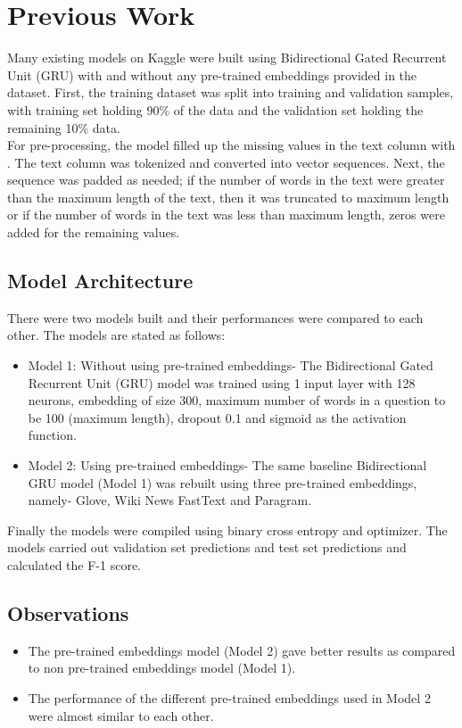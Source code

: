 \section{Previous Work}
Many existing models \cite{Kaggle1} on Kaggle were built using Bidirectional Gated Recurrent Unit (GRU) with and without any pre-trained embeddings provided in the dataset. First, the training dataset was split into training and validation samples, with training set holding 90\% of the data and the validation set holding the remaining 10\% data.\\For pre-processing, the model filled up the missing values in the text column with . The text column was tokenized and converted into vector sequences. Next, the sequence was padded as needed; if the number of words in the text were greater than the maximum length of the text, then it was truncated to maximum length or if the number of words in the text was less than maximum length, zeros were added for the remaining values.\cite{Kaggle}

\subsection{Model Architecture}
There were two models built and their performances were compared to each other. The models are stated as follows:
\begin{itemize}
		\item Model 1: Without using pre-trained embeddings- The Bidirectional Gated Recurrent Unit (GRU) model was trained using 1 input layer with 128 neurons, embedding of size 300, maximum number of words in a question to be 100 (maximum length), dropout 0.1 and sigmoid as the activation function.
		\item Model 2: Using pre-trained embeddings- The same baseline Bidirectional GRU model (Model 1) was rebuilt using three pre-trained embeddings, namely- Glove, Wiki News FastText and Paragram.
\end{itemize}
Finally the models were compiled using binary cross entropy and  optimizer. The models carried out validation set predictions and test set predictions and calculated the F-1 score.

\subsection{Observations}
\begin{itemize}
		\item The pre-trained embeddings model (Model 2) gave better results as compared to non pre-trained embeddings model (Model 1).
		\item The performance of the different pre-trained embeddings used in Model 2 were almost similar to each other.\cite{Kaggle}
\end{itemize}